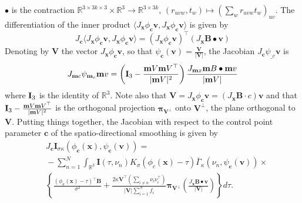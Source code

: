 \documentclass[twocolumn]{svjour3}
\begin{document}
$\bullet$ is the contraction
$\mathbb R^{3\times 3k\times 3}\times \mathbb R^3 \to \mathbb R^{3\times 3k}$,
$(r_{uvw},t_w)\mapsto \left(\sum_{w} r_{uvw}t_w\right)_{uv}$.  The differentiation of the
inner product $\langle J_{\bm x}\phi_{\bm c}\bm v,J_{\bm x}\phi_{\bm c}\bm v\rangle$ is
given by
\begin{equation}
    J_{\bm c}\langle J_{\bm x}\phi_{\bm c}\bm v,J_{\bm x}\phi_{\bm c}\bm v\rangle = \left(J_{\bm x}\phi_{\bm c} \bm v\right)^\top \left(J_{\bm x}\bm B\bullet \bm v\right)
\end{equation}
Denoting by $\bm V$ the vector $J_{\bm x}\phi_{\bm c} \bm v$, so that $\psi_{\bm c}(\bm v) = \frac{\bm V}{|\bm V|}$,  the Jacobian $J_{\bm c}\psi_{\bm_c}\bm v$ is
\begin{equation}
    J_{{\bf m} c}\psi_{{\bf m}_c}{\bf m} v = \left({\bf I}_3 - \frac{{\bf m} V{\bf m} V^\top}{|{\bf m} V|^2}\right)\frac{J_{{\bf m} x}{\bf m} B\bullet {\bf m} v}{|{\bf m} V|}
\end{equation}
where ${\bf I}_3$ is the identity of $\mathbb R^3$. Note also that $\bm V = J_{\bm x}\phi_{\bm c} \bm v = \left(J_{\bm x}\bm B\cdot c\right)\bm v$ and that 
${\bf I}_3 - \frac{{\bf m} V{\bf m} V^\top}{|{\bf m} V|^2}$ is the orthogonal projection ${\bm \pi}_{\bm V^\bot}$ onto $\bm V^\bot$, the plane orthogonal to $\bm V$.  
Putting things together, the Jacobian with respect to the control point parameter $\bm c$ of the spatio-directional smoothing is given by
\begin{align}
   \! \!\!~&J_{\bm c}{\bm I}_{\sigma \kappa}(\phi_{\bm c}(\bm x), \psi_{\bm c}(\bm v)) =\nonumber\\
    &\!\!-\sum_{n=1}^N\int_{\mathbb R^3} \bm I(\tau, \nu_n)K_\sigma(\phi_{c}(\bm x)-\tau)\bar{\Gamma}_\kappa(\nu_n,\psi_{\bm c}(\bm v))\times\nonumber\\
   &\!\!\left\{\!\! \frac{(\phi_{\bm c}(\bm x)-\tau)\!^\top\!\!\bm B}{\sigma^2}\!+\!\!\frac{2\kappa \bm V^\top\!\!\left(\sum_{i\not=n}\nu_i\nu_i^\top\!\right)}{|\bm V|\sum_{i=1}^N f_i}
  {\bm \pi}\!_{\bm V\!^\bot}\!\!\left(\frac{J_{\bm x}\bm B\bullet \bm v}{|\bm V|}\right)  
  \!\! \right\}\!d\tau.
\end{align}
\end{document}
